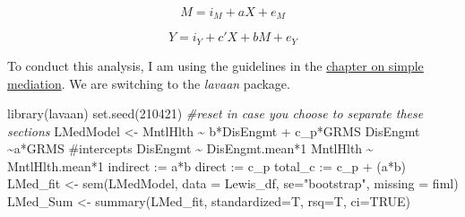 \documentclass[
  11pt,
]{book}
\newenvironment{Shaded}{\begin{snugshade}}{\end{snugshade}}
\newcommand{\AttributeTok}[1]{\textcolor[rgb]{0.77,0.63,0.00}{#1}}
\newcommand{\CommentTok}[1]{\textcolor[rgb]{0.56,0.35,0.01}{\textit{#1}}}
\newcommand{\ConstantTok}[1]{\textcolor[rgb]{0.00,0.00,0.00}{#1}}
\newcommand{\DecValTok}[1]{\textcolor[rgb]{0.00,0.00,0.81}{#1}}
\newcommand{\FunctionTok}[1]{\textcolor[rgb]{0.00,0.00,0.00}{#1}}
\newcommand{\NormalTok}[1]{#1}
\newcommand{\OtherTok}[1]{\textcolor[rgb]{0.56,0.35,0.01}{#1}}
\newcommand{\StringTok}[1]{\textcolor[rgb]{0.31,0.60,0.02}{#1}}
\begin{document}
\[M = i_{M}+aX + e_{M}\]

\[Y = i_{Y}+c'X+ bM+e_{Y}\]

To conduct this analysis, I am using the guidelines in the \protect\hyperlink{SimpleMed}{chapter on simple mediation}. We are switching to the \emph{lavaan} package.

\begin{Shaded}
\begin{Highlighting}[]
\FunctionTok{library}\NormalTok{(lavaan)}
\FunctionTok{set.seed}\NormalTok{(}\DecValTok{210421}\NormalTok{) }\CommentTok{\#reset in case you choose to separate these sections}
\NormalTok{LMedModel }\OtherTok{\textless{}{-}} \StringTok{\textquotesingle{}}
\StringTok{          MntlHlth \textasciitilde{} b*DisEngmt + c\_p*GRMS }
\StringTok{          DisEngmt \textasciitilde{}a*GRMS}
\StringTok{          }
\StringTok{          \#intercepts}
\StringTok{          DisEngmt \textasciitilde{} DisEngmt.mean*1}
\StringTok{          MntlHlth \textasciitilde{} MntlHlth.mean*1}
\StringTok{          }
\StringTok{          indirect :=  a*b}
\StringTok{          direct  := c\_p}
\StringTok{          total\_c  := c\_p + (a*b)}
\StringTok{          \textquotesingle{}}
\NormalTok{LMed\_fit }\OtherTok{\textless{}{-}} \FunctionTok{sem}\NormalTok{(LMedModel, }\AttributeTok{data =}\NormalTok{ Lewis\_df, }\AttributeTok{se=}\StringTok{"bootstrap"}\NormalTok{, }\AttributeTok{missing =} \StringTok{\textquotesingle{}fiml\textquotesingle{}}\NormalTok{)}
\NormalTok{LMed\_Sum }\OtherTok{\textless{}{-}}  \FunctionTok{summary}\NormalTok{(LMed\_fit, }\AttributeTok{standardized=}\NormalTok{T, }\AttributeTok{rsq=}\NormalTok{T, }\AttributeTok{ci=}\ConstantTok{TRUE}\NormalTok{)}
\end{Highlighting}
\end{Shaded}
\end{document}
